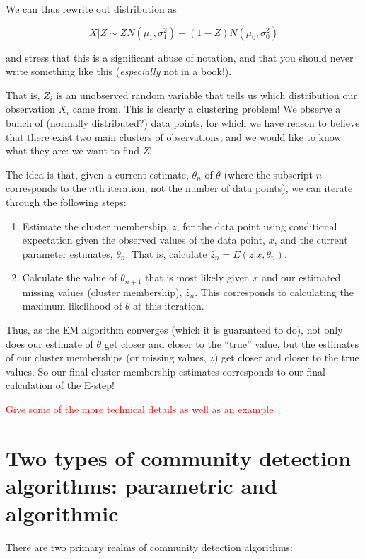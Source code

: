 We can thus rewrite out distribution as

$$X|Z \sim ZN(\mu_1, \sigma_1^2) + (1 - Z) N(\mu_0, \sigma_0^2)$$

and stress that this is a significant abuse of notation, and that you should never write something like this (\emph{especially} not in a book!). 

That is, $Z_i$ is an unobserved random variable that tells us which distribution our observation $X_i$ came from. This is clearly a clustering problem! We observe a bunch of (normally distributed?) data points, for which we have reason to believe that there exist two main clusters of observations, and we would like to know what they are: we want to find $Z$! 

The idea is that, given a current estimate, $\theta_n$ of $\theta$ (where the subscript $n$ corresponds to the $n$th iteration, not the number of data points), we can iterate through the following steps:

\begin{enumerate}
\item Estimate the cluster membership, $z$, for the data point using conditional expectation given the observed values of the data point, $x$, and the current parameter estimates, $\theta_n$. That is, calculate $\hat{z}_n = E(z | x, \theta_n)$.
\item Calculate the value of $\theta_{n+1}$ that is most likely given $x$ and our estimated missing values (cluster membership), $\hat{z}_n$. This corresponds to calculating the maximum likelihood of $\theta$ at this iteration.
\end{enumerate}

Thus, as the EM algorithm converges (which it is guaranteed to do), not only does our estimate of $\theta$ get closer and closer to the ``true'' value, but the estimates of our cluster memberships (or missing values, $z$) get closer and closer to the true values. So our final cluster membership estimates corresponds to our final calculation of the E-step!

\textcolor{red}{Give some of the more technical details as well as an example}


\section{Two types of community detection algorithms: parametric and algorithmic}

There are two primary realms of community detection algorithms: 

